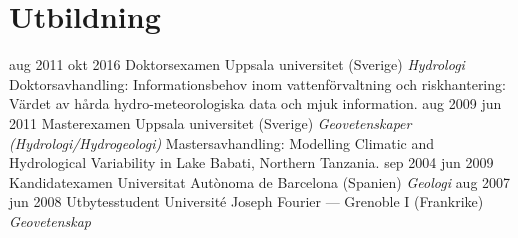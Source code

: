 \ifswedish
  \section{Utbildning}
    \position
      {aug 2011 \textemdash{} okt 2016}
      {Doktorsexamen}
      {Uppsala universitet (Sverige)}
      {\textit{Hydrologi} \newline Doktorsavhandling: Informationsbehov inom vattenförvaltning och riskhantering: Värdet av hårda hydro-meteorologiska data och mjuk information.}
    \position
      {aug 2009 \textemdash{} jun 2011}
      {Masterexamen}
      {Uppsala universitet (Sverige)}
      {\textit{Geovetenskaper (Hydrologi/Hydrogeologi)} \newline Mastersavhandling: Modelling Climatic and Hydrological Variability in Lake Babati, Northern Tanzania.}
    \position
      {sep 2004 \textemdash{} jun 2009}
      {Kandidatexamen}
      {Universitat Autònoma de Barcelona (Spanien)}
      {\textit{Geologi}}
    \position
      {aug 2007 \textemdash{} jun 2008}
      {Utbytesstudent}
      {Université Joseph Fourier --- Grenoble I (Frankrike)}
      {\textit{Geovetenskap}}
\else
